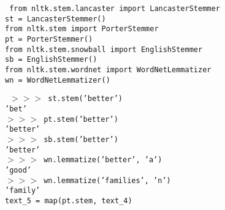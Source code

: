 \documentclass{beamer}
\numberwithin{equation}{section}
\begin{document}
\begin{frame}

{\tt
from nltk.stem.lancaster import LancasterStemmer \\

st = LancasterStemmer()\\



from nltk.stem import PorterStemmer\\

pt = PorterStemmer()\\


from nltk.stem.snowball import EnglishStemmer\\

sb = EnglishStemmer()\\


from nltk.stem.wordnet import WordNetLemmatizer\\

wn = WordNetLemmatizer()\\

}


\end{frame}



\begin{frame}

{\tt
$>>>$ st.stem('better') \\
'bet'\\ 
$>>>$ pt.stem('better') \\
'better' \\
$>>>$ sb.stem('better') \\
'better' \\
$>>>$ wn.lemmatize('better', 'a') \\
'good' \\
$>>>$ wn.lemmatize('families', 'n') \\
'family'\\



text\_5 = map(pt.stem, text\_4)


}


\end{frame}
\end{document}
